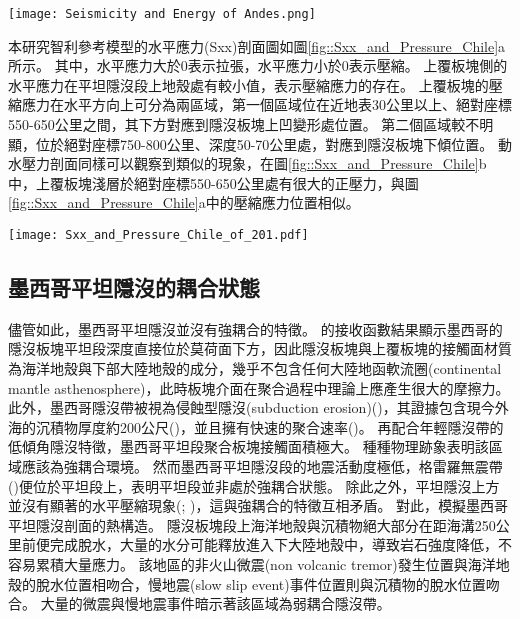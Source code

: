 \begin{figure*}[htp]
    \centering
    \texttt{[image: Seismicity and Energy of Andes.png]}
    \caption[智利沿岸自21$^\circ$S到44$^\circ$S的上板塊地震活動統計分析，摘自\citet{gutscher2002andean}]{智利沿岸自20$^\circ$S到40$^\circ$S的上板塊地震活動統計分析，摘自\citet{gutscher2002andean}。這裡採用深度<70公里的地震事件總能量，單位為10$^6$焦耳。右側數字表示1900-1963年/1964-1995年間所示分的地震能量。數字下灰色底框標示出平坦隱沒段的位置。
    }
    \label{fig::Chile_seismicity}
\end{figure*}

本研究智利參考模型的水平應力(Sxx)剖面圖如圖\ref{fig::Sxx_and_Pressure_Chile}a所示。
其中，水平應力大於0表示拉張，水平應力小於0表示壓縮。
上覆板塊側的水平應力在平坦隱沒段上地殼處有較小值，表示壓縮應力的存在。
上覆板塊的壓縮應力在水平方向上可分為兩區域，第一個區域位在近地表30公里以上、絕對座標550-650公里之間，其下方對應到隱沒板塊上凹變形處位置。
第二個區域較不明顯，位於絕對座標750-800公里、深度50-70公里處，對應到隱沒板塊下傾位置。
動水壓力剖面同樣可以觀察到類似的現象，在圖\ref{fig::Sxx_and_Pressure_Chile}b中，上覆板塊淺層於絕對座標550-650公里處有很大的正壓力，與圖\ref{fig::Sxx_and_Pressure_Chile}a中的壓縮應力位置相似。

\begin{figure*}[h]
    \centering
    \texttt{[image: Sxx\_and\_Pressure\_Chile\_of\_201.pdf]}
    \caption[智利參考模型於40 Myr的水平軸差應力與動水壓力剖面]{智利參考模型於40 Myr的水平軸差應力與動水壓力剖面，其中應力正向代表拉張應力，負向代表壓縮應力。}
    \label{fig::Sxx_and_Pressure_Chile}
\end{figure*}
\subsection{墨西哥平坦隱沒的耦合狀態}
儘管如此，墨西哥平坦隱沒並沒有強耦合的特徵。
\citet{PerezCampos2008}的接收函數結果顯示墨西哥的隱沒板塊平坦段深度直接位於莫荷面下方，因此隱沒板塊與上覆板塊的接觸面材質為海洋地殼與下部大陸地殼的成分，幾乎不包含任何大陸地函軟流圈(continental mantle asthenosphere)，此時板塊介面在聚合過程中理論上應產生很大的摩擦力。
此外，墨西哥隱沒帶被視為侵蝕型隱沒(subduction erosion)(\citealp{stern2011subduction})，其證據包含現今外海的沉積物厚度約200公尺(\citealp{manea2003sediment})，並且擁有快速的聚合速率(\citealp{o2005uncertainties})。
再配合年輕隱沒帶的低傾角隱沒特徵，墨西哥平坦段聚合板塊接觸面積極大。
種種物理跡象表明該區域應該為強耦合環境。
然而墨西哥平坦隱沒段的地震活動度極低，格雷羅無震帶(\citealp{kostoglodov2003large})便位於平坦段上，表明平坦段並非處於強耦合狀態。
除此之外，平坦隱沒上方並沒有顯著的水平壓縮現象(\citealp{nieto2006latest}; \citealp{moran2007cenozoic})，這與強耦合的特徵互相矛盾。
對此，\citet{Manea2011Thermal}模擬墨西哥平坦隱沒剖面的熱構造。
隱沒板塊段上海洋地殼與沉積物絕大部分在距海溝250公里前便完成脫水，大量的水分可能釋放進入下大陸地殼中，導致岩石強度降低，不容易累積大量應力。
該地區的非火山微震(non volcanic tremor)發生位置與海洋地殼的脫水位置相吻合\citet{Manea2011Thermal}，慢地震(slow slip event)事件位置則與沉積物的脫水位置吻合\citet{Song2009}。
大量的微震與慢地震事件暗示著該區域為弱耦合隱沒帶。

